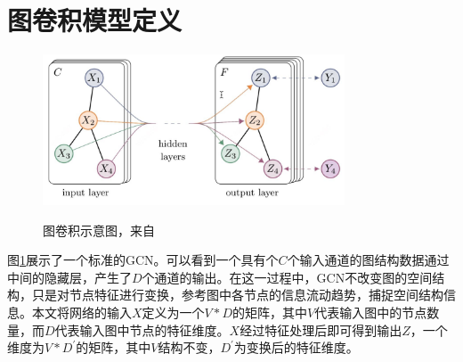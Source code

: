 \section{图卷积模型定义} \label{gcn_model_define}
\begin{figure}[ht]
    \centering
    \includegraphics[width=0.80\textwidth]{FigMa/GCN-SEMI.png}\\
    \vspace{-0.3cm}
    \caption{图卷积示意图，来自\parencite{kipf2016semi}}
    \label{fig:GCN-SEMI}
\end{figure}
图\ref{fig:GCN-SEMI}展示了一个标准的GCN。可以看到一个具有个$C$个输入通道的图结构数据通过中间的隐藏层，产生了$D$个通道的输出。在这一过程中，GCN不改变图的空间结构，只是对节点特征进行变换，参考图中各节点的信息流动趋势，捕捉空间结构信息。本文将网络的输入$X$定义为一个$V*D$的矩阵，其中$V$代表输入图中的节点数量，而$D$代表输入图中节点的特征维度。$X$经过特征处理后即可得到输出$Z$，一个维度为$V*D^{\prime}$的矩阵，其中$V$结构不变，$D^{\prime}$为变换后的特征维度。

